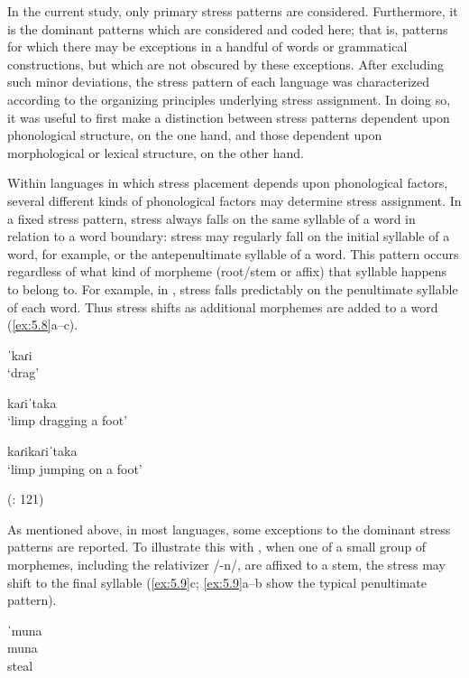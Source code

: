   In the current study, only primary stress patterns are considered. Furthermore, it is the dominant patterns which are considered and coded here; that is, patterns for which there may be exceptions in a handful of words or grammatical constructions, but which are not obscured by these exceptions. After excluding such minor deviations, the stress pattern of each language was characterized according to the organizing principles underlying stress assignment. In doing so, it was useful to first make a distinction between stress patterns dependent upon phonological structure, on the one hand, and those dependent upon morphological or lexical structure, on the other hand.

   Within languages in which stress placement depends upon phonological factors, several different kinds of phonological factors may determine stress assignment. In a fixed stress pattern, stress always falls on the same syllable of a word in relation to a word boundary: stress may regularly fall on the initial syllable of a word, for example, or the antepenultimate syllable of a word. This pattern occurs regardless of what kind of morpheme (root/stem or affix) that syllable happens to belong to. For example, in , stress falls predictably on the penultimate syllable of each word. Thus stress shifts as additional morphemes are added to a word (\ref{ex:5.8}a--c).

\ea\label{ex:5.8}

\ea   ˈkaɾi\\
\glt ‘drag’

\ex   kaɾiˈtaka\\
\glt ‘limp dragging a foot’

\ex   kaɾikaɾiˈtaka\\
\glt ‘limp jumping on a foot’

(\citealt{VallejosYopán2010}: 121)
\z
\z

  As mentioned above, in most languages, some exceptions to the dominant stress patterns are reported. To illustrate this with , when one of a small group of morphemes, including the relativizer /-n/, are affixed to a stem, the stress may shift to the final syllable (\ref{ex:5.9}c; \ref{ex:5.9}a--b show the typical penultimate pattern).

\ea\label{ex:5.9}
\ea   ˈmuna\\
  muna\\
steal

